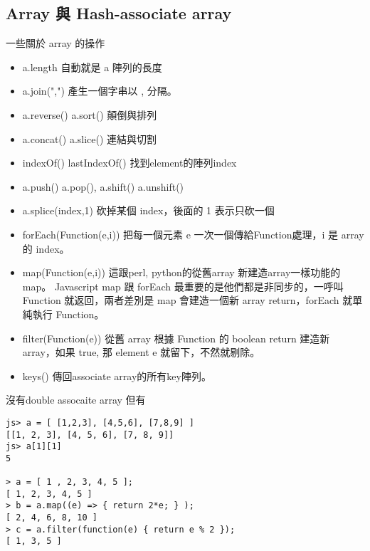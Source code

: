 \subsection{Array 與 Hash-associate array}
一些關於 array 的操作
\begin{itemize}
  \item a.length 自動就是 a 陣列的長度
  \item a.join(",") 產生一個字串以 , 分隔。
  \item a.reverse() a.sort() 顛倒與排列
  \item a.concat() a.slice() 連結與切割
  \item indexOf() lastIndexOf() 找到element的陣列index
  \item a.push() a.pop(), a.shift() a.unshift()
  \item a.splice(index,1) 砍掉某個 index，後面的 1 表示只砍一個
  \item forEach(Function(e,i)) 把每一個元素 e 一次一個傳給Function處理，i 是
    array 的 index。
  \item map(Function(e,i)) 這跟perl, python的從舊array 新建造array一樣功能的
    map。 Javascript map 跟 forEach 最重要的是他們都是非同步的，一呼叫
    Function 就返回，兩者差別是 map 會建造一個新 array return，forEach 就單
    純執行 Function。
  \item filter(Function(e)) 從舊 array 根據 Function 的 boolean return 
    建造新 array，如果 true, 那 element e 就留下，不然就剔除。
  \item keys() 傳回associate array的所有key陣列。
\end{itemize}
沒有double assocaite array 但有
\begin{verbatim}
js> a = [ [1,2,3], [4,5,6], [7,8,9] ]
[[1, 2, 3], [4, 5, 6], [7, 8, 9]]
js> a[1][1]
5

> a = [ 1 , 2, 3, 4, 5 ];
[ 1, 2, 3, 4, 5 ]
> b = a.map((e) => { return 2*e; } );
[ 2, 4, 6, 8, 10 ]
> c = a.filter(function(e) { return e % 2 });
[ 1, 3, 5 ]
\end{verbatim}

